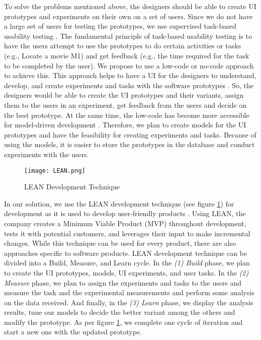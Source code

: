 To solve the problems mentioned above, the designers should be able to create UI prototypes and experiments on their own on a set of users.
Since we do not have a large set of users for testing the prototypes, we use supervised task-based usability testing \cite{article:dataanalysis:supervisedtest}.
The fundamental principle of task-based usability testing is to have the users attempt to use the prototypes to do certain activities or tasks (e.g., Locate a movie M1) and get feedback (e.g., the time required for the task to be completed by the user).
We propose to use a low-code or no-code approach to achieve this.
This approach helps to have a UI for the designers to understand, develop, and create experiments and tasks with the software prototypes \cite{paper:lowcode:khorram}.
So, the designers would be able to create the UI prototypes and their variants, assign them to the users in an experiment, get feedback from the users and decide on the best prototype.
At the same time, the low-code has become more accessible for model-driven development \cite{article:lowcode:modeldriven}.
Therefore, we plan to create models for the UI prototypes and have the feasibility for creating experiments and tasks. 
Because of using the models, it is easier to store the prototypes in the database and conduct experiments with the users. 

\begin{figure}[ht]
    \centering
    \texttt{[image: LEAN.png]}
    \caption{LEAN Development Technique}
    \label{intro:fig:lean}
\end{figure}

In our solution, we use the LEAN development technique (see figure \ref{intro:fig:lean}) for development as it is used to develop user-friendly products \cite{article:lean:hart}.
Using LEAN, the company creates a Minimum Viable Product (MVP) throughout development, tests it with potential customers, and leverages their input to make incremental changes.
While this technique can be used for every product, there are also approaches specific to software products.
LEAN development technique can be divided into a Build, Measure, and Learn cycle. 
In the \textit{(1) Build} phase, we plan to create the UI prototypes, models, UI experiments, and user tasks.
In the \textit{(2) Measure} phase, we plan to assign the experiments and tasks to the users and measure the task and the experimental measurements and perform some analysis on the data received. 
And finally, in the \textit{(3) Learn} phase, we display the analysis results, tune our models to decide the better variant among the others and modify the prototype.
As per figure \ref{intro:fig:lean}, we complete one cycle of iteration and start a new one with the updated prototype.

